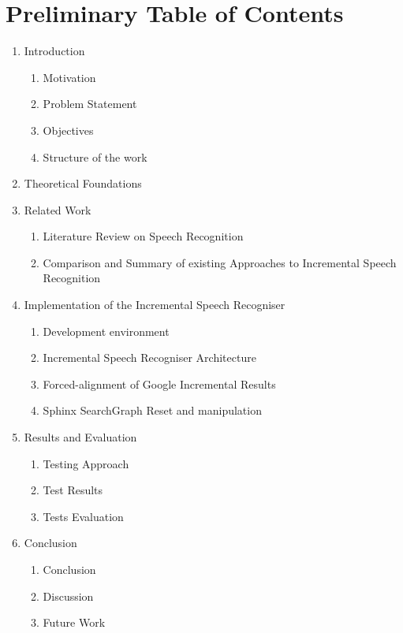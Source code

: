 \section {Preliminary Table of Contents}
\begin{enumerate}
  \item Introduction
  \begin{enumerate}[label*=\arabic*.]
    \item Motivation
    \item Problem Statement
    \item Objectives
    \item Structure of the work   
  \end{enumerate}
  \item Theoretical Foundations
  \item Related Work
  \begin {enumerate}[label*=\arabic*.]
    \item Literature Review on Speech Recognition
    \item Comparison and Summary of existing Approaches to Incremental
    Speech Recognition   
    \end {enumerate}
  \item Implementation of the Incremental Speech Recogniser 
  \begin {enumerate}[label*=\arabic*.] 
     \item Development environment
    \item Incremental Speech Recogniser Architecture
    \item Forced-alignment of Google Incremental Results
    \item Sphinx SearchGraph Reset and manipulation
    \end {enumerate}
  \item Results and Evaluation
    \begin {enumerate}[label*=\arabic*.]
  \item Testing Approach
  \item Test Results
  \item Tests Evaluation
  \end  {enumerate} 
  \item Conclusion
  \begin {enumerate}[label*=\arabic*.]
    \item Conclusion
    \item Discussion
    \item Future Work
    \end {enumerate}
\end{enumerate}
